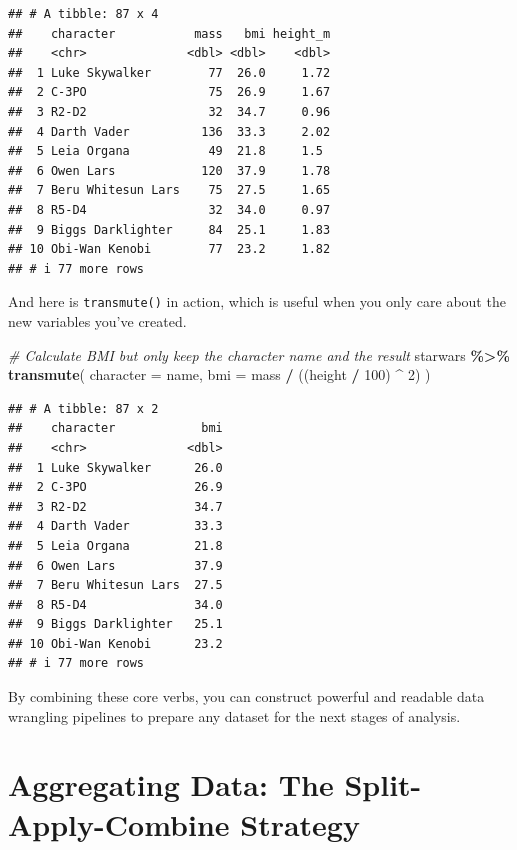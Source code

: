 \documentclass[
  11pt,
]{article}
\newenvironment{Shaded}{\begin{snugshade}}{\end{snugshade}}
\newcommand{\AttributeTok}[1]{\textcolor[rgb]{0.13,0.29,0.53}{#1}}
\newcommand{\CommentTok}[1]{\textcolor[rgb]{0.56,0.35,0.01}{\textit{#1}}}
\newcommand{\DecValTok}[1]{\textcolor[rgb]{0.00,0.00,0.81}{#1}}
\newcommand{\FunctionTok}[1]{\textcolor[rgb]{0.13,0.29,0.53}{\textbf{#1}}}
\newcommand{\NormalTok}[1]{#1}
\newcommand{\SpecialCharTok}[1]{\textcolor[rgb]{0.81,0.36,0.00}{\textbf{#1}}}
\begin{document}
\begin{verbatim}
## # A tibble: 87 x 4
##    character           mass   bmi height_m
##    <chr>              <dbl> <dbl>    <dbl>
##  1 Luke Skywalker        77  26.0     1.72
##  2 C-3PO                 75  26.9     1.67
##  3 R2-D2                 32  34.7     0.96
##  4 Darth Vader          136  33.3     2.02
##  5 Leia Organa           49  21.8     1.5 
##  6 Owen Lars            120  37.9     1.78
##  7 Beru Whitesun Lars    75  27.5     1.65
##  8 R5-D4                 32  34.0     0.97
##  9 Biggs Darklighter     84  25.1     1.83
## 10 Obi-Wan Kenobi        77  23.2     1.82
## # i 77 more rows
\end{verbatim}

And here is \texttt{transmute()} in action, which is useful when you
only care about the new variables you've created.

\begin{Shaded}
\begin{Highlighting}[]
\CommentTok{\# Calculate BMI but only keep the character name and the result}
\NormalTok{starwars }\SpecialCharTok{\%\textgreater{}\%}
  \FunctionTok{transmute}\NormalTok{(}
    \AttributeTok{character =}\NormalTok{ name,}
    \AttributeTok{bmi =}\NormalTok{ mass }\SpecialCharTok{/}\NormalTok{ ((height }\SpecialCharTok{/} \DecValTok{100}\NormalTok{) }\SpecialCharTok{\^{}} \DecValTok{2}\NormalTok{)}
\NormalTok{  )}
\end{Highlighting}
\end{Shaded}

\begin{verbatim}
## # A tibble: 87 x 2
##    character            bmi
##    <chr>              <dbl>
##  1 Luke Skywalker      26.0
##  2 C-3PO               26.9
##  3 R2-D2               34.7
##  4 Darth Vader         33.3
##  5 Leia Organa         21.8
##  6 Owen Lars           37.9
##  7 Beru Whitesun Lars  27.5
##  8 R5-D4               34.0
##  9 Biggs Darklighter   25.1
## 10 Obi-Wan Kenobi      23.2
## # i 77 more rows
\end{verbatim}

By combining these core verbs, you can construct powerful and readable
data wrangling pipelines to prepare any dataset for the next stages of
analysis.

\section{Aggregating Data: The Split-Apply-Combine
Strategy}\label{aggregating-data-the-split-apply-combine-strategy}
\end{document}
